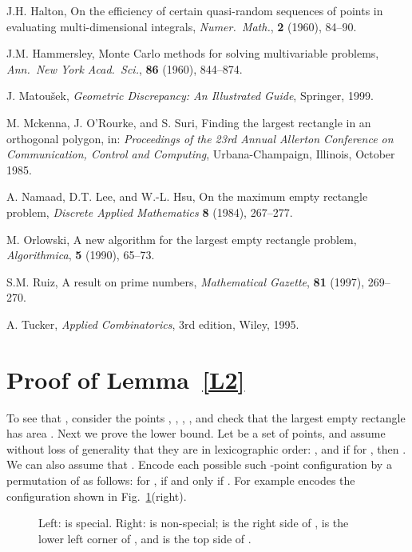 \documentclass[11pt]{article}
\begin{document}
\begin{thebibliography}{9}
J.H. Halton,
On the efficiency of certain quasi-random sequences of points in
evaluating multi-dimensional integrals, 
\emph{Numer.\ Math.}, 
\textbf{2} (1960), 84--90.

J.M. Hammersley,
Monte Carlo methods for solving multivariable problems,
\emph{Ann.\ New York Acad.\ Sci.}, 
\textbf{86} (1960), 844--874.

J. Matou\v{s}ek,
\emph{Geometric Discrepancy: An Illustrated Guide},
Springer, 1999.

M. Mckenna, J. O'Rourke, and S. Suri,
Finding the largest rectangle in an orthogonal polygon,
in: \emph{Proceedings of the 23rd Annual Allerton Conference on Communication,
  Control and Computing}, Urbana-Champaign, Illinois, October 1985. 

A. Namaad, D.T. Lee, and  W.-L. Hsu,
On the maximum empty rectangle problem,
\emph{Discrete Applied Mathematics}
\textbf{8} (1984), 267--277.

M. Orlowski,
A new algorithm for the largest empty rectangle problem,
\emph{Algorithmica},
\textbf{5} (1990), 65--73.

S.M. Ruiz,
A result on prime numbers,
\emph{Mathematical Gazette},
\textbf{81} (1997), 269--270.

A. Tucker,
\emph{Applied Combinatorics}, 3rd edition,
Wiley, 1995.

\end{thebibliography}




\appendix


\section{Proof of Lemma~\ref{L2}} \label{app:L2}

To see that , consider the  points
, 
,
,
,
and check that the largest empty rectangle has area  . 
Next we prove the lower bound. 
Let  be a set of  points, and assume without
loss of generality that they are in lexicographic order: 
,  
and if  for , then . 
We can also assume that . Encode each possible such
-point configuration by a permutation  of  as follows:
for ,  if and only if . 
For example  encodes the configuration shown in
Fig.~\ref{f1}(right). 
\begin{figure} [htb]
\centerline{\epsfxsize=4in }
\caption{\small Left:  is special.
Right:  is non-special;  is the right side of , 
is the lower left corner of , and  is the top side of .} 
\label{f1}
\end{figure}
\end{document}
